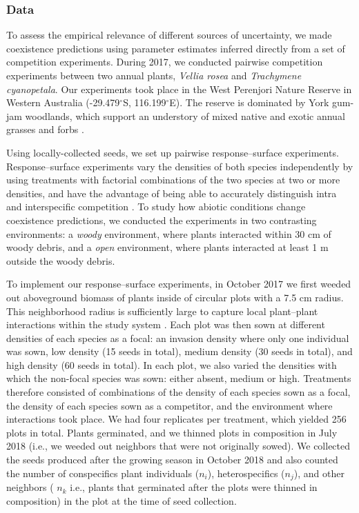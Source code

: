 \begin{refsection}
\subsubsection*{Data}

To assess the empirical relevance of different sources of uncertainty, we made coexistence predictions using parameter estimates inferred directly from a set of competition experiments. During 2017, we conducted pairwise competition experiments between two annual plants, \textit{Vellia rosea} and \textit{Trachymene cyanopetala}. Our experiments took place in the West Perenjori Nature Reserve in Western Australia (-29.479$^{\circ}$S, 116.199$^{\circ}$E). The reserve is dominated by York gum-jam woodlands, which support an understory of mixed native and exotic annual grasses and forbs \citep{dwyer2015climate}.

Using locally-collected seeds, we set up pairwise response--surface experiments. Response--surface experiments vary the densities of both species independently by using treatments with factorial combinations of the two species at two or more densities, and have the advantage of being able to accurately distinguish intra and interspecific competition \citep{inouye_response_2001, hart2018quantify}. To study how abiotic conditions change coexistence predictions, we conducted the experiments in two contrasting environments: a \textit{woody} environment, where plants interacted within 30 cm of woody debris, and a \textit{open} environment, where plants interacted at least 1 m outside the woody debris.

To implement our response--surface experiments, in October 2017 we first weeded out aboveground biomass of plants inside of circular plots with a 7.5 cm radius. This neighborhood radius is sufficiently large to capture local plant--plant interactions within the study system \citep{martyn2021identifying}. Each plot was then sown at different densities of each species as a focal: an invasion density where only one individual was sown, low density (15 seeds in total), medium density (30 seeds in total), and high density (60 seeds in total). In each plot, we also varied the densities with which the non-focal species was sown: either absent, medium or high. Treatments therefore consisted of combinations of the density of each species sown as a focal, the density of each species sown as a competitor, and the environment where interactions took place. We had four replicates per treatment, which yielded 256 plots in total. Plants germinated, and we thinned plots in composition in July 2018 (i.e., we weeded out neighbors that were not originally sowed). We collected the seeds produced after the growing season in October 2018 and also counted the number of conspecifics plant individuals ($n_{i}$), heterospecifics ($n_{j}$), and other neighbors ( $n_{k}$ i.e., plants that germinated after the plots were thinned in composition) in the plot at the time of seed collection.


\end{refsection}
